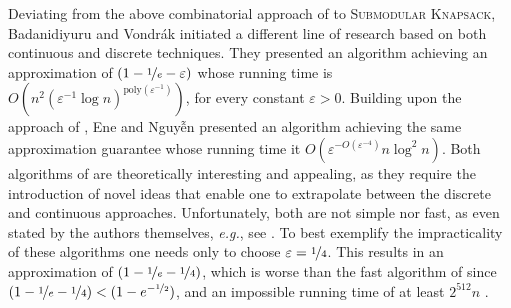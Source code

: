 \documentclass[a4paper,UKenglish,cleveref, autoref]{lipics-v2019}
\newcommand{\SK}{{\textsc{Submodular Knapsack}}\xspace}
\begin{document}
Deviating from the above combinatorial approach of \cite{khuller1999budgeted,sviridenko2004note} to \SK, Badanidiyuru and Vondr\'{a}k \cite{badanidiyuru2014fast} initiated a different line of research based on both continuous and discrete techniques.
They presented an algorithm achieving an approximation of $(1-\nicefrac[]{1}{e}-\varepsilon)$ whose running time is $O(n^2(\varepsilon ^{-1}\log n)^{\text{poly}(\varepsilon^{-1})})$, for every constant $\varepsilon >0$.
Building upon the approach of \cite{badanidiyuru2014fast}, Ene and Nguy\~{\^{e}}n \cite{Alina2017} presented an algorithm achieving the same approximation guarantee whose running time it $O(\varepsilon^{-O(\varepsilon^{-4})}n \log^2 n)$.
Both algorithms of \cite{badanidiyuru2014fast,Alina2017} are theoretically interesting and appealing, as they require the introduction of novel ideas that enable one to extrapolate between the discrete and continuous approaches.
Unfortunately, both are not simple nor fast, as even stated by the authors themselves, {\em e.g.}, see \cite{Alina2017}.
To best exemplify the impracticality of these algorithms one needs only to choose $\varepsilon = \nicefrac[]{1}{4}$.
This results in an approximation of $(1-\nicefrac[]{1}{e}-\nicefrac[]{1}{4})$, which is worse than the fast algorithm of \cite{khuller1999budgeted} since $(1-\nicefrac[]{1}{e}-\nicefrac[]{1}{4})<(1-e^{-\nicefrac[]{1}{2}})$, and an impossible running time of at least $2^{512} n$ \cite{Alina2017}.

\end{document}
